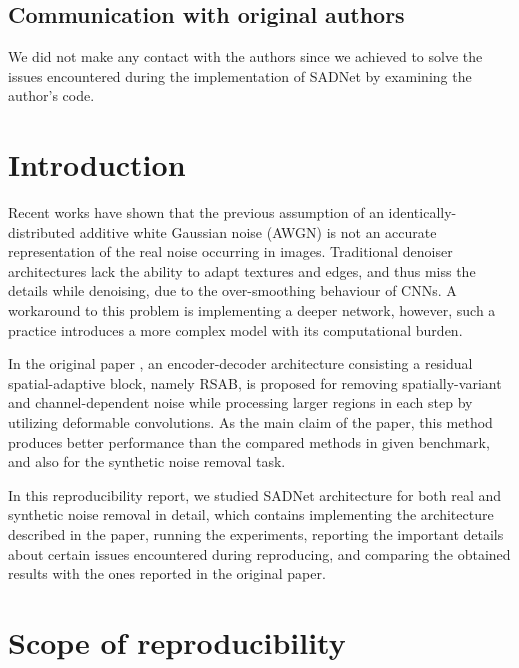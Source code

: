 \subsection*{Communication with original authors}
We did not make any contact with the authors since we achieved to solve the issues encountered during the implementation of SADNet by examining the author's code. 


\section{Introduction}
Recent works \cite{NEURIPS2018_f0e52b27, Zhou_Jiao_Huang_Wang_Wang_Shi_Huang_2020, Guo2019Cbdnet, anwar2019ridnet} have shown that the previous assumption of an identically-distributed additive white Gaussian noise (AWGN) is not an accurate representation of the real noise occurring in images. Traditional denoiser architectures lack the ability to adapt textures and edges, and thus miss the details while denoising, due to the over-smoothing behaviour of CNNs. A workaround to this problem is implementing a deeper network, however, such a practice introduces a more complex model with its computational burden.

In the original paper \cite{10.1007/978-3-030-58577-8_11}, an encoder-decoder architecture consisting a residual spatial-adaptive block, namely RSAB, is proposed for removing spatially-variant and channel-dependent noise while processing larger regions in each step by utilizing deformable convolutions. As the main claim of the paper, this method produces better performance than the compared methods in given benchmark, and also for the synthetic noise removal task.

In this reproducibility report, we studied SADNet architecture for both real and synthetic noise removal in detail, which contains implementing the architecture described in the paper, running the experiments, reporting the important details about certain issues encountered during reproducing, and comparing the obtained results with the ones
reported in the original paper.

\section{Scope of reproducibility}

